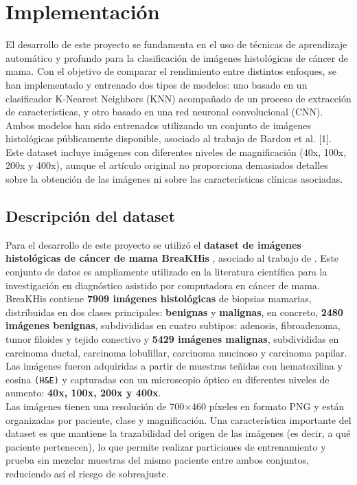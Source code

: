 \documentclass[12pt]{article} %
\begin{document}
\newpage
\section{Implementación}
El desarrollo de este proyecto se fundamenta en el uso de técnicas de aprendizaje automático y profundo para la clasificación de imágenes histológicas de cáncer de mama. Con el objetivo de comparar el rendimiento entre distintos enfoques, se han implementado y entrenado dos tipos de modelos: uno basado en un clasificador K-Nearest Neighbors (KNN) acompañado de un proceso de extracción de características, y otro basado en una red neuronal convolucional (CNN). Ambos modelos han sido entrenados utilizando un conjunto de imágenes histológicas públicamente disponible, asociado al trabajo de Bardou et al. [1]. Este dataset incluye imágenes con diferentes niveles de magnificación (40x, 100x, 200x y 400x), aunque el artículo original no proporciona demasiados detalles sobre la obtención de las imágenes ni sobre las características clínicas asociadas.\\

\subsection{Descripción del dataset}
Para el desarrollo de este proyecto se utilizó el \textbf{dataset de imágenes histológicas de cáncer de mama BreaKHis} \cite{google_drive_folder}, asociado al trabajo de \cite{bardou2018classification}. Este conjunto de datos es ampliamente utilizado en la literatura científica para la investigación en diagnóstico asistido por computadora en cáncer de mama. BreaKHis contiene \textbf{7909 imágenes histológicas} de biopsias mamarias, distribuidas en dos clases principales: \textbf{benignas} y \textbf{malignas}, en concreto, \textbf{2480 imágenes benignas}, subdivididas en cuatro subtipos: adenosis, fibroadenoma, tumor filoides y tejido conectivo y  \textbf{5429 imágenes malignas}, subdivididas en carcinoma ductal, carcinoma lobulillar, carcinoma mucinoso y carcinoma papilar. Las imágenes fueron adquiridas a partir de muestras teñidas con hematoxilina y eosina \texttt{(H\&E)} y capturadas con un microscopio óptico en diferentes niveles de aumento: \textbf{40x, 100x, 200x y 400x}.\\

Las imágenes tienen una resolución de 700×460 píxeles en formato PNG y están organizadas por paciente, clase y magnificación. Una característica importante del dataset es que mantiene la trazabilidad del origen de las imágenes (es decir, a qué paciente pertenecen), lo que permite realizar particiones de entrenamiento y prueba sin mezclar muestras del mismo paciente entre ambos conjuntos, reduciendo así el riesgo de sobreajuste.
\end{document}
